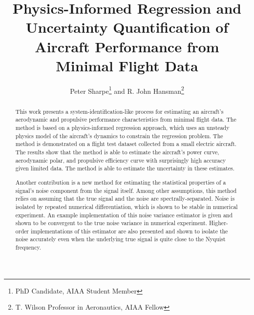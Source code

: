 \documentclass[conf]{new-aiaa}
\title{Physics-Informed Regression and Uncertainty Quantification of Aircraft Performance from Minimal Flight Data}
\author{Peter Sharpe\footnote{PhD Candidate, AIAA Student Member} and R. John Hansman\footnote{T. Wilson Professor in Aeronautics, AIAA Fellow}}
\affil{Massachusetts Institute of Technology, Cambridge, MA}
\begin{document}
    \maketitle

    \begin{abstract}

        This work presents a system-identification-like process for estimating an aircraft's aerodynamic and propulsive performance characteristics from minimal flight data. The method is based on a physics-informed regression approach, which uses an unsteady physics model of the aircraft's dynamics to constrain the regression problem. The method is demonstrated on a flight test dataset collected from a small electric aircraft. The results show that the method is able to estimate the aircraft's power curve, aerodynamic polar, and propulsive efficiency curve with surprisingly high accuracy given limited data. The method is able to estimate the uncertainty in these estimates.

        Another contribution is a new method for estimating the statistical properties of a signal's noise component from the signal itself. Among other assumptions, this method relies on assuming that the true signal and the noise are spectrally-separated. Noise is isolated by repeated numerical differentiation, which is shown to be stable in numerical experiment. An example implementation of this noise variance estimator is given and shown to be convergent to the true noise variance in numerical experiment. Higher-order implementations of this estimator are also presented and shown to isolate the noise accurately even when the underlying true signal is quite close to the Nyquist frequency.

    \end{abstract}
\end{document}
